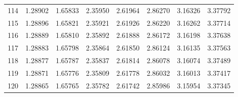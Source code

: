 \begin{tabular}{lrrrrrrr}
114 & 1.28902 & 1.65833 & 2.35950 & 2.61964 & 2.86270 & 3.16326 & 3.37792 \\
115 & 1.28896 & 1.65821 & 2.35921 & 2.61926 & 2.86220 & 3.16262 & 3.37714 \\
116 & 1.28889 & 1.65810 & 2.35892 & 2.61888 & 2.86172 & 3.16198 & 3.37638 \\
117 & 1.28883 & 1.65798 & 2.35864 & 2.61850 & 2.86124 & 3.16135 & 3.37563 \\
118 & 1.28877 & 1.65787 & 2.35837 & 2.61814 & 2.86078 & 3.16074 & 3.37489 \\
119 & 1.28871 & 1.65776 & 2.35809 & 2.61778 & 2.86032 & 3.16013 & 3.37417 \\
120 & 1.28865 & 1.65765 & 2.35782 & 2.61742 & 2.85986 & 3.15954 & 3.37345 \\
\end{tabular}
